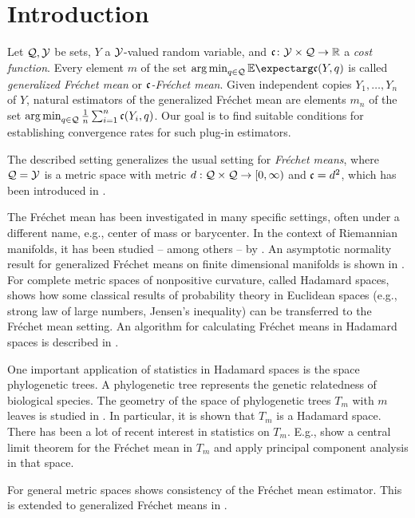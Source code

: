 \section{Introduction}
%
%
Let $\mathcal{Q}, \mathcal{Y}$ be sets, $Y$ a $\mathcal{Y}$-valued random variable, and $\mathfrak{c} \colon \mathcal{Y}\times \mathcal{Q} \to \mathbb{R}$ a \textit{cost function}. Every element $m$ of the set  $\argmin_{q\in\mc Q}\Ex{\mf c(Y,q)}$ is called \textit{generalized Fréchet mean} or \textit{$\mathfrak{c}$-Fréchet mean}.
Given independent copies $Y_1, \dots, Y_n$ of $Y$, natural estimators of the generalized Fréchet mean are elements $m_n$ of  the set $\operatorname*{arg\,min}_{q\in\mathcal{Q}}  \frac1n\sum_{i=1}^n \mathfrak{c}(Y_i,q)$. 
Our goal is to find suitable conditions for establishing convergence rates for such plug-in estimators. 

The described setting generalizes the usual setting for \textit{Fréchet means}, where $\mathcal{Q} = \mathcal{Y}$ is a metric space with metric $d : \mathcal{Q} \times \mathcal{Q} \to [0, \infty)$ and $\mathfrak{c} = d^2$, which has been introduced in \cite{frechet48}.

The Fréchet mean has been investigated in many specific settings, often under a different name, e.g., center of mass or barycenter.
In the context of Riemannian manifolds, it has been studied -- among others -- by \cite{bhattacharya03}.
An asymptotic normality result for generalized Fréchet means on finite dimensional manifolds is shown in \cite{huckemann18}.
For complete metric spaces of nonpositive curvature, called Hadamard spaces, \cite{sturm03} shows how some classical results of probability theory in Euclidean spaces (e.g., strong law of large numbers, Jensen's inequality) can be transferred to the Fréchet mean setting. An algorithm for calculating Fréchet means in Hadamard spaces is described in \cite{bacak14}.

One important application of statistics in Hadamard spaces is the space phylogenetic trees. A phylogenetic tree represents the genetic relatedness of biological species. The geometry of the space of phylogenetic trees $T_m$ with $m$ leaves is studied in \cite{billera01}. In particular, it is shown that $T_m$ is a Hadamard space. There has been a lot of recent interest in statistics on $T_m$. E.g., \cite{barden18} show a central limit theorem for the Fréchet mean in $T_m$ and \cite{nye11} apply principal component analysis in that space.

For general metric spaces \cite{ziezold77} shows consistency of the Fréchet mean estimator. This is extended to generalized Fréchet means in \cite{huckemann11}.

